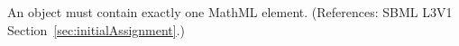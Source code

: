 An \InitialAssignment object must contain exactly one MathML 
element.  (References: SBML L3V1 Section~\ref{sec:initialAssignment}.)
